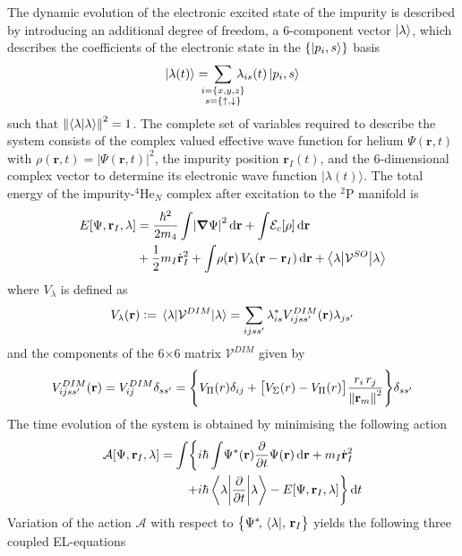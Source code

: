 			The dynamic evolution of the electronic excited state of the impurity is described by introducing an additional degree of freedom, a 6-component vector $\ket\lambda$, which describes the coefficients of the electronic state in the $\qty{\ket{p_i,s}}$ basis
			\begin{align}
				\ket{\lambda(t)} = \!\!\!\!\!\sum_{\substack{i=\{x,y,z\}\\s=\{\uparrow,\downarrow\}}}\!\!\!\!\! \lambda_{is}(t) \ket{p_i,s}
			\end{align}
			such that $\norm{\ip{\lambda}}^2=1$. The complete set of variables required to describe the
			system consists of the complex valued effective wave function for helium $\Psi(\mathbf{r}, t)$ with
			$\rho(\mathbf{r}, t) = |\Psi(\mathbf{r}, t)|^2$, the impurity position $\mathbf{r}_I(t)$, and the 6-dimensional complex vector to determine 
			its electronic wave function $|\lambda(t)\rangle$. The total energy of the impurity-$^4$He$_N$ complex after excitation to the $^2$P manifold is
			\begin{align}
				E[\Psi, \vec{r}_I, \lambda] &= \frac{\hbar^2}{2m_4}\int\!\abs{\grad \Psi}^2\diff{r}
				+ \int\!{\cal E}_c[\rho]\diff{r} \nonumber \\
				&+ \frac{1}{2} m_I \dot{\vec{r}}^2_I
				+ \int\!\rho(\vec{r})\,V_\lambda(\vec{r}-\vec{r}_I)\diff{r}
				+ \ev**{\mathcal{V}^{SO}}{\lambda}
			\end{align}
			where $V_\lambda$ is defined as
			\begin{align}
				V_\lambda(\vec{r}) \vcentcolon= \ev{\mathcal{V}^{DIM}}{\lambda} = \sum_{ijss'}\lambda^*_{is}V^{DIM}_{ijss'}(\vec{r})\lambda_{js'} 
			\end{align}
			and the components of the 6$\times$6 matrix ${\mathcal V}^{DIM}$ given by
			\begin{equation}
				V^{DIM}_{ijss'}(\bm{\mathrm{r}})=V^{DIM}_{ij}\delta_{ss'}=\qty{V_\Pi(r)\delta_{ij}+\qty\big[V_\Sigma(r)-V_\Pi(r)]\frac{r_i\,r_j}{\norm{\bm{\mathrm{r}}_m}^2}}\delta_{ss'}
			\end{equation}
			The time evolution of the system is obtained by minimising the following action
			\begin{align}
				\mathcal{A}[\Psi,\vec{r}_I,\lambda] = \int\!\bigg\{&i\hbar\int \!\Psi^*(\vec{r}) \pdv{t}\Psi(\vec{r})\dd{\vec{r}} + m_I\dot{\vec{r}}^2_I \nonumber \\
				+&i\hbar\ev**{\pdv{t}}{\lambda} -E[\Psi,\vec{r}_I,\lambda]\bigg\}\dd{t} \label{eq:action}
			\end{align}
			Variation of the action $\mathcal{A}$ with respect to $\qty\big{\Psi^*\!,\,\bra\lambda\!,\,\bm{\mathrm{r}}_I}$ yields the following three coupled EL-equations
